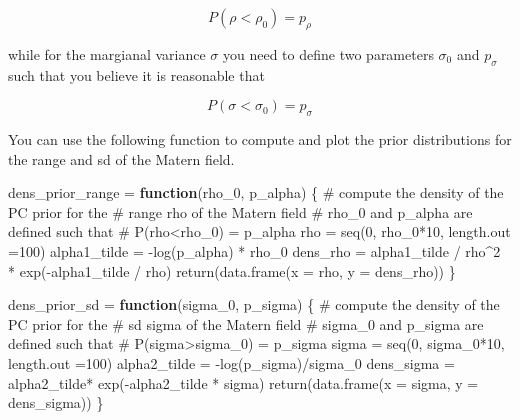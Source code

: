 \documentclass[
  letterpaper,
  DIV=11,
  numbers=noendperiod]{scrartcl}
\newenvironment{Shaded}{\begin{snugshade}}{\end{snugshade}}
\newcommand{\AttributeTok}[1]{\textcolor[rgb]{0.40,0.45,0.13}{#1}}
\newcommand{\CommentTok}[1]{\textcolor[rgb]{0.37,0.37,0.37}{#1}}
\newcommand{\ControlFlowTok}[1]{\textcolor[rgb]{0.00,0.23,0.31}{\textbf{#1}}}
\newcommand{\DecValTok}[1]{\textcolor[rgb]{0.68,0.00,0.00}{#1}}
\newcommand{\FunctionTok}[1]{\textcolor[rgb]{0.28,0.35,0.67}{#1}}
\newcommand{\NormalTok}[1]{\textcolor[rgb]{0.00,0.23,0.31}{#1}}
\newcommand{\OtherTok}[1]{\textcolor[rgb]{0.00,0.23,0.31}{#1}}
\newcommand{\SpecialCharTok}[1]{\textcolor[rgb]{0.37,0.37,0.37}{#1}}
\begin{document}
\[
P(\rho<\rho_0)=p_{\rho}
\]

while for the margianal variance \(\sigma\) you need to define two
parameters \(\sigma_0\) and \(p_{\sigma}\) such that you believe it is
reasonable that

\[
P(\sigma<\sigma_0)=p_{\sigma}
\]

You can use the following function to compute and plot the prior
distributions for the range and sd of the Matern field.

\begin{Shaded}
\begin{Highlighting}[]
\NormalTok{dens\_prior\_range }\OtherTok{=} \ControlFlowTok{function}\NormalTok{(rho\_0, p\_alpha)}
\NormalTok{\{}
  \CommentTok{\# compute the density of the PC prior for the}
  \CommentTok{\# range rho of the Matern field}
  \CommentTok{\# rho\_0 and p\_alpha are defined such that}
  \CommentTok{\# P(rho\textless{}rho\_0) = p\_alpha}
\NormalTok{  rho }\OtherTok{=} \FunctionTok{seq}\NormalTok{(}\DecValTok{0}\NormalTok{, rho\_0}\SpecialCharTok{*}\DecValTok{10}\NormalTok{, }\AttributeTok{length.out =}\DecValTok{100}\NormalTok{)}
\NormalTok{  alpha1\_tilde }\OtherTok{=} \SpecialCharTok{{-}}\FunctionTok{log}\NormalTok{(p\_alpha) }\SpecialCharTok{*}\NormalTok{ rho\_0}
\NormalTok{  dens\_rho }\OtherTok{=}\NormalTok{  alpha1\_tilde }\SpecialCharTok{/}\NormalTok{ rho}\SpecialCharTok{\^{}}\DecValTok{2} \SpecialCharTok{*} \FunctionTok{exp}\NormalTok{(}\SpecialCharTok{{-}}\NormalTok{alpha1\_tilde }\SpecialCharTok{/}\NormalTok{ rho)}
  \FunctionTok{return}\NormalTok{(}\FunctionTok{data.frame}\NormalTok{(}\AttributeTok{x =}\NormalTok{ rho, }\AttributeTok{y =}\NormalTok{ dens\_rho))}
\NormalTok{\}}

\NormalTok{dens\_prior\_sd }\OtherTok{=} \ControlFlowTok{function}\NormalTok{(sigma\_0, p\_sigma)}
\NormalTok{\{}
  \CommentTok{\# compute the density of the PC prior for the}
  \CommentTok{\# sd sigma of the Matern field}
  \CommentTok{\# sigma\_0 and p\_sigma are defined such that}
  \CommentTok{\# P(sigma\textgreater{}sigma\_0) = p\_sigma}
\NormalTok{  sigma }\OtherTok{=} \FunctionTok{seq}\NormalTok{(}\DecValTok{0}\NormalTok{, sigma\_0}\SpecialCharTok{*}\DecValTok{10}\NormalTok{, }\AttributeTok{length.out =}\DecValTok{100}\NormalTok{)}
\NormalTok{  alpha2\_tilde }\OtherTok{=} \SpecialCharTok{{-}}\FunctionTok{log}\NormalTok{(p\_sigma)}\SpecialCharTok{/}\NormalTok{sigma\_0}
\NormalTok{  dens\_sigma }\OtherTok{=}\NormalTok{ alpha2\_tilde}\SpecialCharTok{*} \FunctionTok{exp}\NormalTok{(}\SpecialCharTok{{-}}\NormalTok{alpha2\_tilde }\SpecialCharTok{*}\NormalTok{ sigma) }
  \FunctionTok{return}\NormalTok{(}\FunctionTok{data.frame}\NormalTok{(}\AttributeTok{x =}\NormalTok{ sigma, }\AttributeTok{y =}\NormalTok{ dens\_sigma))}
\NormalTok{\}}
\end{Highlighting}
\end{Shaded}
\end{document}
